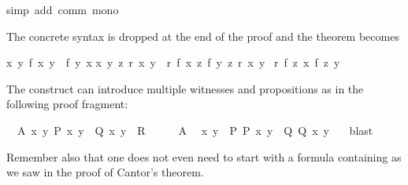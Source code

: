 \begin{isabellebody}
%
\isatagproof
{}\isamarkupfalse%
{\isacharparenleft}simp\ add{\isacharcolon}\ comm\ mono{\isacharparenright}%
\endisatagproof
{\isafoldproof}%
%
\isadelimproof
%
\endisadelimproof
%
\begin{isamarkuptext}%
\noindent The concrete syntax is dropped at the end of the proof and the
theorem becomes \begin{isabelle}%
{\isasymlbrakk}{\isasymAnd}x\ y{\isachardot}\ {\isacharquery}f\ x\ y\ {\isacharequal}\ {\isacharquery}f\ y\ x{\isacharsemicolon}\isanewline
\isaindent{\ }{\isasymAnd}x\ y\ z{\isachardot}\ {\isacharquery}r\ x\ y\ {\isasymLongrightarrow}\ {\isacharquery}r\ {\isacharparenleft}{\isacharquery}f\ x\ z{\isacharparenright}\ {\isacharparenleft}{\isacharquery}f\ y\ z{\isacharparenright}{\isacharsemicolon}\ {\isacharquery}r\ {\isacharquery}x\ {\isacharquery}y{\isasymrbrakk}\isanewline
{\isasymLongrightarrow}\ {\isacharquery}r\ {\isacharparenleft}{\isacharquery}f\ {\isacharquery}z\ {\isacharquery}x{\isacharparenright}\ {\isacharparenleft}{\isacharquery}f\ {\isacharquery}z\ {\isacharquery}y{\isacharparenright}%
\end{isabelle}
\tweakskip%
\end{isamarkuptext}%
\isamarkuptrue%
%
\isamarkuptrue%
%
\begin{isamarkuptext}%
The  construct can introduce multiple
witnesses and propositions as in the following proof fragment:%
\end{isamarkuptext}%
\isamarkuptrue%
\isamarkupfalse%
\ \ A{\isacharcolon}\ {\isachardoublequoteopen}{\isasymexists}x\ y{\isachardot}\ P\ x\ y\ {\isasymand}\ Q\ x\ y{\isachardoublequoteclose}\ \ {\isachardoublequoteopen}R{\isachardoublequoteclose}\isanewline
%
\isadelimproof
%
\endisadelimproof
%
\isatagproof
{}\isamarkupfalse%
\ {\isacharminus}\isanewline
\ \ \isamarkupfalse%
\ A\ \isamarkupfalse%
\ x\ y\ \ P{\isacharcolon}\ {\isachardoublequoteopen}P\ x\ y{\isachardoublequoteclose}\ \ Q{\isacharcolon}\ {\isachardoublequoteopen}Q\ x\ y{\isachardoublequoteclose}\ \ \isamarkupfalse%
\ blast%
\endisatagproof
{\isafoldproof}%
%
\isadelimproof
%
\endisadelimproof
%
\begin{isamarkuptext}%
Remember also that one does not even need to start with a formula
containing \isa{{\isasymexists}} as we saw in the proof of Cantor's theorem.%
\end{isamarkuptext}%

\end{isabellebody}
